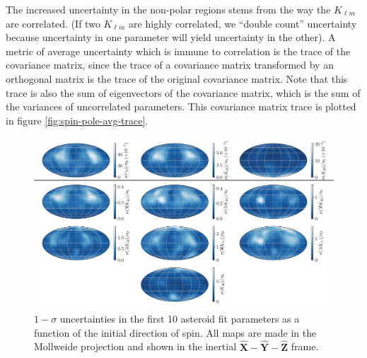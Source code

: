 \documentclass{aastex631}
\newcommand{\unit}[1]{\hat{\bm{#1}}}
\begin{document}
The increased uncertainty in the non-polar regions stems from the way the $K_{\ell m}$ are correlated. (If two $K_{\ell m}$ are highly correlated, we ``double count'' uncertainty because uncertainty in one parameter will yield uncertainty in the other). A metric of average uncertainty which is immune to correlation is the trace of the covariance matrix, since the trace of a covariance matrix transformed by an orthogonal matrix is the trace of the original covariance matrix. Note that this trace is also the sum of eigenvectors of the covariance matrix, which is the sum of the variances of uncorrelated parameters. This covariance matrix trace is plotted in figure \ref{fig:spin-pole-avg-trace}.



\begin{figure}
  \centering
  \includegraphics[width=\textwidth]{spin-pole.pdf}
  \caption{$1-\sigma$ uncertainties in the first 10 asteroid fit parameters as a function of the initial direction of spin. All maps are made in the Mollweide projection and shown in the inertial $\unit X-\unit Y-\unit Z$ frame.}
  \label{fig:spin-pole}
\end{figure}
\end{document}
